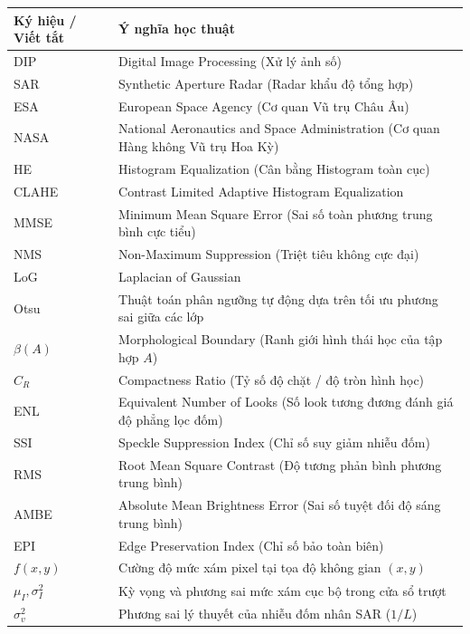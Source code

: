 \documentclass[12pt,a4paper]{report}
\begin{document}
\begin{table}[H]
\centering
\begin{tabularx}{\textwidth}{lX}
\toprule
\textbf{Ký hiệu / Viết tắt} & \textbf{Ý nghĩa học thuật} \\
\midrule
DIP & Digital Image Processing (Xử lý ảnh số) \\
SAR & Synthetic Aperture Radar (Radar khẩu độ tổng hợp) \\
ESA & European Space Agency (Cơ quan Vũ trụ Châu Âu) \\
NASA & National Aeronautics and Space Administration (Cơ quan Hàng không Vũ trụ Hoa Kỳ) \\
HE & Histogram Equalization (Cân bằng Histogram toàn cục) \\
CLAHE & Contrast Limited Adaptive Histogram Equalization \\
MMSE & Minimum Mean Square Error (Sai số toàn phương trung bình cực tiểu) \\
NMS & Non-Maximum Suppression (Triệt tiêu không cực đại) \\
LoG & Laplacian of Gaussian \\
Otsu & Thuật toán phân ngưỡng tự động dựa trên tối ưu phương sai giữa các lớp \\
$\beta(A)$ & Morphological Boundary (Ranh giới hình thái học của tập hợp $A$) \\
$C_R$ & Compactness Ratio (Tỷ số độ chặt / độ tròn hình học) \\
ENL & Equivalent Number of Looks (Số look tương đương đánh giá độ phẳng lọc đốm) \\
SSI & Speckle Suppression Index (Chỉ số suy giảm nhiễu đốm) \\
RMS & Root Mean Square Contrast (Độ tương phản bình phương trung bình) \\
AMBE & Absolute Mean Brightness Error (Sai số tuyệt đối độ sáng trung bình) \\
EPI & Edge Preservation Index (Chỉ số bảo toàn biên) \\
$f(x, y)$ & Cường độ mức xám pixel tại tọa độ không gian $(x, y)$ \\
$\mu_I, \sigma_I^2$ & Kỳ vọng và phương sai mức xám cục bộ trong cửa sổ trượt \\
$\sigma_v^2$ & Phương sai lý thuyết của nhiễu đốm nhân SAR ($1/L$) \\
\bottomrule
\end{tabularx}
\end{table}
\end{document}
